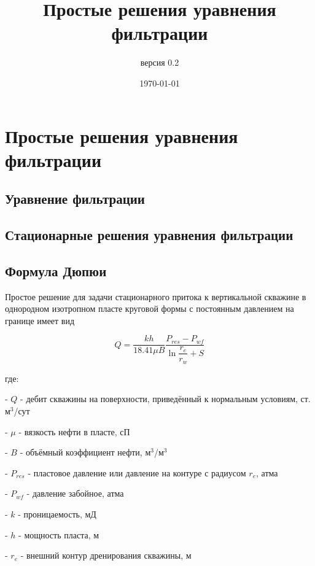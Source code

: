 \documentclass[oneside, openany]{memoir}
\author{версия 0.2}
\title{Простые решения уравнения фильтрации}
\date{\today}
\begin{document}
	
	\maketitle
	
	\chapter{Простые решения уравнения фильтрации}
	
	\section{Уравнение фильтрации}
	
	
	
	
	\section{Стационарные решения уравнения фильтрации}
	
	
	
	
	\section{Формула Дюпюи}
	
	Простое решение для задачи стационарного притока к вертикальной скважине в однородном изотропном пласте круговой формы с постоянным давлением на границе имеет вид
	
	\begin{equation}
		Q=\dfrac{kh}{18.41\mu B} \dfrac{P_{res}-P_{wf}}{\ln \dfrac{r_e}{r_w} + S} 
	\end{equation}
	
	
	где: 
	
	- $Q$ - дебит скважины на поверхности, приведённый к нормальным условиям, ст. м$^3$/сут
	
	- $\mu$ - вязкость нефти в пласте, сП
	
	- $B$ - объёмный коэффициент нефти, м$^3$/м$^3$
	
	- $P_{res}$ - пластовое давление или давление на контуре с радиусом $r_e$, атма
	
	- $P_{wf}$ - давление забойное, атма
	
	- $k$ - проницаемость, мД
	
	- $h$ - мощность пласта, м
	
	- $r_e$ - внешний контур дренирования скважины, м
	
\end{document}
